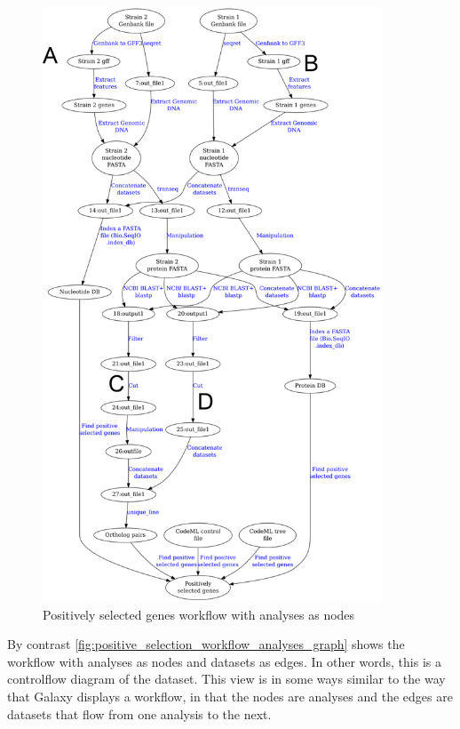 \documentclass[a4paper,10pt]{scrreprt} \usepackage[utf8]{inputenc}
\begin{document}
\begin{figure}[h!]
\centering
\includegraphics[width=0.9\textwidth]{images/positive_selection_workflow_graph.png}
\caption{Positively selected genes workflow with analyses as nodes}
\label{fig:positive_selection_workflow_graph}
\end{figure}

By contrast \ref{fig:positive_selection_workflow_analyses_graph} shows the
workflow with analyses as nodes and datasets as edges. In other words, this is a \gls{controlflow} diagram
of the dataset. This view is in some ways similar to the way that Galaxy displays a workflow, in that
the nodes are analyses and the edges are datasets that flow from one analysis to the next.
\end{document}
